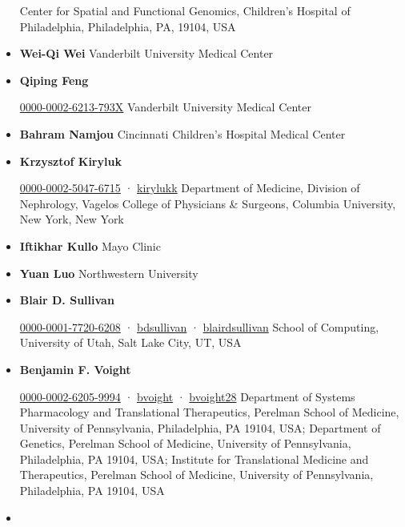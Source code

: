 \documentclass[
]{article}
\begin{document}
\begin{itemize}
  Center for Spatial and Functional Genomics, Children's Hospital of Philadelphia, Philadelphia, PA, 19104, USA
\item
  \textbf{Wei-Qi Wei}
  Vanderbilt University Medical Center
\item
  \textbf{Qiping Feng}
  
  \href{https://orcid.org/0000-0002-6213-793X}{0000-0002-6213-793X}
  Vanderbilt University Medical Center
\item
  \textbf{Bahram Namjou}
  Cincinnati Children's Hospital Medical Center
\item
  \textbf{Krzysztof Kiryluk}
  
  \href{https://orcid.org/0000-0002-5047-6715}{0000-0002-5047-6715}
  · 
  \href{https://twitter.com/kirylukk}{kirylukk}
  Department of Medicine, Division of Nephrology, Vagelos College of Physicians \& Surgeons, Columbia University, New York, New York
\item
  \textbf{Iftikhar Kullo}
  Mayo Clinic
\item
  \textbf{Yuan Luo}
  Northwestern University
\item
  \textbf{Blair D. Sullivan}
  
  \href{https://orcid.org/0000-0001-7720-6208}{0000-0001-7720-6208}
  · 
  \href{https://github.com/bdsullivan}{bdsullivan}
  · 
  \href{https://twitter.com/blairdsullivan}{blairdsullivan}
  School of Computing, University of Utah, Salt Lake City, UT, USA
\item
  \textbf{Benjamin F. Voight}
  
  \href{https://orcid.org/0000-0002-6205-9994}{0000-0002-6205-9994}
  · 
  \href{https://github.com/bvoight}{bvoight}
  · 
  \href{https://twitter.com/bvoight28}{bvoight28}
  Department of Systems Pharmacology and Translational Therapeutics, Perelman School of Medicine, University of Pennsylvania, Philadelphia, PA 19104, USA; Department of Genetics, Perelman School of Medicine, University of Pennsylvania, Philadelphia, PA 19104, USA; Institute for Translational Medicine and Therapeutics, Perelman School of Medicine, University of Pennsylvania, Philadelphia, PA 19104, USA
\item

\end{itemize}
\end{document}
